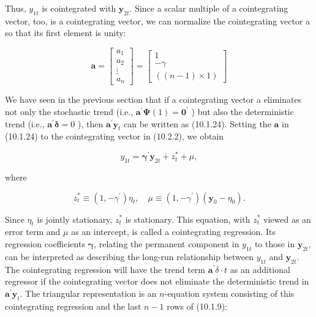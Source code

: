 \documentclass[10pt]{article}
\begin{document}
Thus, $y_{1 t}$ is cointegrated with $\mathbf{y}_{2 t}$. Since a scalar multiple of a cointegrating vector, too, is a cointegrating vector, we can normalize the cointegrating vector a so that its first element is unity:

\[
\mathbf{a}=\left[\begin{array}{c}
a_{1}  \tag{10.2.2}\\
a_{2} \\
\vdots \\
a_{n}
\end{array}\right]=\left[\begin{array}{c}
1 \\
-\gamma \\
((n-1) \times 1)
\end{array}\right]
\]

We have seen in the previous section that if a cointegrating vector a eliminates not only the stochastic trend (i.e., $\mathbf{a}^{\prime} \boldsymbol{\Psi}(1)=\mathbf{0}^{\prime}$ ) but also the deterministic trend (i.e., $\mathbf{a}^{\prime} \boldsymbol{\delta}=0$ ), then $\mathbf{a}^{\prime} \mathbf{y}_{t}$ can be written as (10.1.24). Setting the $\mathbf{a}$ in (10.1.24) to the cointegrating vector in (10.2.2), we obtain


\begin{equation*}
y_{1 t}=\boldsymbol{\gamma}^{\prime} \mathbf{y}_{2 t}+z_{t}^{*}+\mu, \tag{10.2.3}
\end{equation*}


where


\begin{equation*}
z_{t}^{*} \equiv\left(1,-\gamma^{\prime}\right) \eta_{t}, \quad \mu \equiv\left(1,-\gamma^{\prime}\right)\left(\mathbf{y}_{0}-\eta_{0}\right) . \tag{10.2.4}
\end{equation*}


Since $\eta_{t}$ is jointly stationary, $z_{t}^{*}$ is stationary. This equation, with $z_{t}^{*}$ viewed as an error term and $\mu$ as an intercept, is called a cointegrating regression. Its regression coefficients $\boldsymbol{\gamma}$, relating the permanent component in $y_{1 t}$ to those in $\mathbf{y}_{2 t}$, can be interpreted as describing the long-run relationship between $y_{1 t}$ and $\mathbf{y}_{2 t}$. The cointegrating regression will have the trend term $\mathbf{a}^{\prime} \delta \cdot t$ as an additional regressor if the cointegrating vector does not eliminate the deterministic trend in $\mathbf{a}^{\prime} \mathbf{y}_{t}$. The triangular representation is an $n$-equation system consisting of this cointegrating regression and the last $n-1$ rows of (10.1.9):
\end{document}
